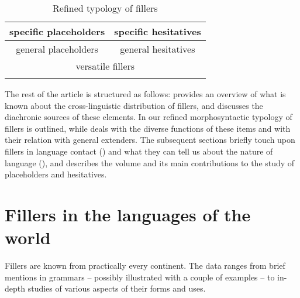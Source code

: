 \documentclass[output=paper]{langscibook}
\begin{document}
\begin{table}
    \begin{tabular}{cc}
    \lsptoprule
        specific placeholders & specific hesitatives \\
        \midrule
       general placeholders  &  general hesitatives\\
       \midrule
    \multicolumn{2}{c}{versatile fillers}\\
    \lspbottomrule
    \end{tabular}
\caption{\label{tab:intro:1} Refined typology of fillers}
\end{table}

The rest of the article is structured as follows:  provides an overview of what is known about the cross-linguistic distribution of fillers, and  discusses the diachronic sources of these elements. In  our refined morphosyntactic typology of fillers is outlined, while  deals with the diverse functions of these items and  with their relation with general extenders. The subsequent sections briefly touch upon fillers in language contact () and what they can tell us about the nature of language (), and  describes the volume and its main contributions to the study of placeholders and hesitatives.

\section{Fillers in the languages of the world}\label{sec:intro:2}

Fillers are known from practically every continent. The data ranges from brief mentions in grammars – possibly illustrated with a couple of examples – to in-depth studies of various aspects of their forms and uses. 
\end{document}
